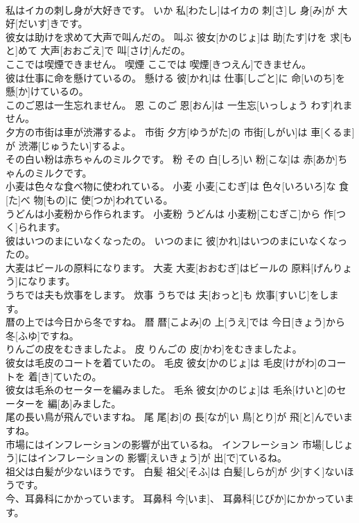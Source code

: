 \documentclass[8pt]{extreport}
\begin{document}
\begin{CJK}{UTF8}{min}
\\	私はイカの刺し身が大好きです。	いか	私[わたし]はイカの 刺[さ]し 身[み]が 大好[だいす]きです。	
\\	彼女は助けを求めて大声で叫んだの。	叫ぶ	彼女[かのじょ]は 助[たす]けを 求[もと]めて 大声[おおごえ]で 叫[さけ]んだの。	
\\	ここでは喫煙できません。	喫煙	ここでは 喫煙[きつえん]できません。	
\\	彼は仕事に命を懸けているの。	懸ける	彼[かれ]は 仕事[しごと]に 命[いのち]を 懸[か]けているの。	
\\	このご恩は一生忘れません。	恩	このご 恩[おん]は 一生忘[いっしょう わす]れません。	
\\	夕方の市街は車が渋滞するよ。	市街	夕方[ゆうがた]の 市街[しがい]は 車[くるま]が 渋滞[じゅうたい]するよ。	
\\	その白い粉は赤ちゃんのミルクです。	粉	その 白[しろ]い 粉[こな]は 赤[あか]ちゃんのミルクです。	
\\	小麦は色々な食べ物に使われている。	小麦	小麦[こむぎ]は 色々[いろいろ]な 食[た]べ 物[もの]に 使[つか]われている。	
\\	うどんは小麦粉から作られます。	小麦粉	うどんは 小麦粉[こむぎこ]から 作[つく]られます。	
\\	彼はいつのまにいなくなったの。	いつのまに	彼[かれ]はいつのまにいなくなったの。	
\\	大麦はビールの原料になります。	大麦	大麦[おおむぎ]はビールの 原料[げんりょう]になります。	
\\	うちでは夫も炊事をします。	炊事	うちでは 夫[おっと]も 炊事[すいじ]をします。	
\\	暦の上では今日から冬ですね。	暦	暦[こよみ]の 上[うえ]では 今日[きょう]から 冬[ふゆ]ですね。	
\\	りんごの皮をむきましたよ。	皮	りんごの 皮[かわ]をむきましたよ。	
\\	彼女は毛皮のコートを着ていたの。	毛皮	彼女[かのじょ]は 毛皮[けがわ]のコートを 着[き]ていたの。	
\\	彼女は毛糸のセーターを編みました。	毛糸	彼女[かのじょ]は 毛糸[けいと]のセーターを 編[あ]みました。	
\\	尾の長い鳥が飛んでいますね。	尾	尾[お]の 長[なが]い 鳥[とり]が 飛[と]んでいますね。	
\\	市場にはインフレーションの影響が出ているね。	インフレーション	市場[しじょう]にはインフレーションの 影響[えいきょう]が 出[で]ているね。	
\\	祖父は白髪が少ないほうです。	白髪	祖父[そふ]は 白髪[しらが]が 少[すく]ないほうです。	
\\	今、耳鼻科にかかっています。	耳鼻科	今[いま]、 耳鼻科[じびか]にかかっています。	

\end{CJK}
\end{document}
